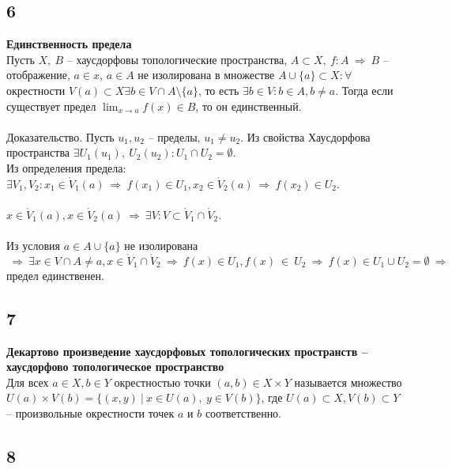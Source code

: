 		\subsection{6}
		\textbf{Единственность предела}
		\\
		Пусть $X,\ B$ -- хаусдорфовы топологические пространства, $A \subset X,\ f: A \ \Rightarrow \ B$ -- отображение, $a \in x$, $a \in A$ не изолирована в множестве $A \cup \{a\} \subset X: \forall$ окрестности $V(a) \subset X \exists b \in V \cap A \setminus \{a\}$, то есть $\exists b \in V: b \in A, b \neq a$. Тогда если существует предел $\lim_{x\to a} f(x) \in B$, то он единственный.\\ 
		\\
		Доказательство. Пусть $u_1, u_2$ -- пределы, $u_1 \neq u_2$. Из свойства Хаусдорфова пространства $\exists U_1(u_1),\ U_2(u_2): U_1 \cap U_2 = \emptyset$.\\
		Из определения предела: $\exists V_1, V_2: x_1 \in \mathring V_{1}(a) \ \Rightarrow \ f(x_1) \in U_1, x_2 \in \mathring V_{2}(a) \ \Rightarrow \ f(x_2) \in U_2$.\\ 
		\\
		$x \in \mathring V_{1}(a), x \in \mathring V_{2}(a) \ \Rightarrow \ \exists V: V \subset \mathring V_{1} \cap \mathring V_{2}$.\\ 
		\\
		Из условия $a \in A \cup \{a\}$ не изолирована $\ \Rightarrow \ \exists x \in V \cap A \neq a, x \in \mathring V_{1} \cap \mathring V_{2} \ \Rightarrow \ f(x) \in U_1, f(x) \ \in \ U_2 \ \Rightarrow \ f(x) \in U_1 \cup U_{2} = \emptyset \ \Rightarrow \ $ предел единственен. 
		
		\subsection{7}
		\textbf{Декартово произведение хаусдорфовых топологических пространств -- хаусдорфово топологическое пространство}
		\\
		Для всех $a \in X, b \in Y$ окрестностью точки $(a, b) \in X \times Y$ называется множество $U(a) \times V(b) = \{(x, y)\ |\ x \in U(a),\ y \in V(b)\}$, где $U(a) \subset X, V(b) \subset Y$ -- произвольные окрестности точек $a$ и $b$ соответственно.\\ 
		
		\subsection{8}
		
